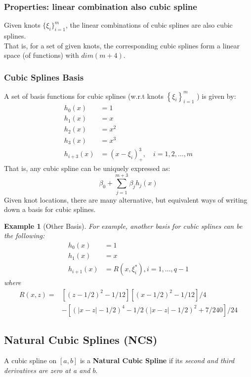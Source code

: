 \documentclass[11pt,a4paper]{article}
\newtheorem{example}{Example}
\begin{document}
\subsubsection{Properties: linear combination also cubic spline}
Given knots $\{\xi_i\}_{i=1}^m$, the linear combinations of cubic splines are also cubic splines.\\
That is, for a set of given knots, the corresponding cubic splines form a linear space (of functions) with ${dim} (m + 4)$.

\subsubsection{Cubic Splines Basis}
A set of basis functions for cubic splines (w.r.t knots $\left\{\xi_{i}\right\}_{i=1}^{m}$ ) is given by:
$$
\begin{aligned}
h_{0}(x) &=1 \\
h_{1}(x) &=x \\
h_{2}(x) &=x^{2} \\
h_{3}(x) &=x^{3} \\
h_{i+3}(x) &=\left(x-\xi_{i}\right)_{+}^{3}, \quad i=1,2, \ldots, m
\end{aligned}
$$
That is, any cubic spline can be uniquely expressed as:
$$
\beta_{0}+\sum_{j=1}^{m+3} \beta_{j} h_{j}(x)
$$
Given knot locations, there are many alternative, but equivalent ways of writing down a basis for cubic splines.
\begin{example}[Other Basis]
    For example, another basis for cubic splines can be the following:
    $$
    \begin{aligned}
    h_{0}(x) &=1 \\
    h_{1}(x) &=x \\
    h_{i+1}(x) &=R\left(x, \xi_{i}^{*}\right), i=1, \ldots, q-1
    \end{aligned}
    $$
    where
    $$
    \begin{aligned}
    R(x, z)=&\left[(z-1 / 2)^{2}-1 / 12\right]\left[(x-1 / 2)^{2}-1 / 12\right] / 4 \\
    &-\left[(|x-z|-1 / 2)^{4}-1 / 2(|x-z|-1 / 2)^{2}+7 / 240\right] / 24
    \end{aligned}
    $$
\end{example}

\subsection{Natural Cubic Splines (NCS)}
A cubic spline on $[a, b]$ is a \textbf{Natural Cubic Spline} if its \textit{second and third derivatives are zero at a and $b$}.
\end{document}
